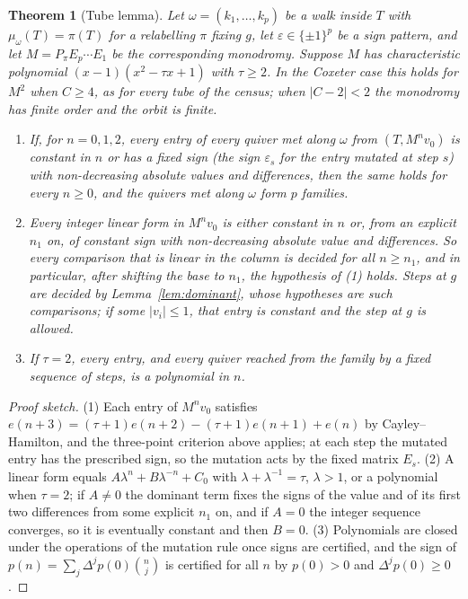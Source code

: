 \documentclass[11pt]{amsart}
\newtheorem{theorem}{Theorem}[section]
\theoremstyle{definition}
\theoremstyle{remark}
\begin{document}
\begin{theorem}[Tube lemma]\label{thm:tube}
Let $\omega=(k_1,\dots,k_p)$ be a walk inside $T$ with $\mu_\omega(T)=\pi(T)$ for a relabelling $\pi$ fixing $g$, let $\varepsilon\in\{\pm1\}^p$ be a sign pattern, and let $M=P_\pi E_p\cdots E_1$ be the corresponding monodromy. Suppose $M$ has characteristic polynomial $(x-1)(x^2-\tau x+1)$ with $\tau\ge2$. In the Coxeter case this holds for $M^2$ when $C\ge4$, as for every tube of the census; when $|C-2|<2$ the monodromy has finite order and the orbit is finite.
\begin{enumerate}
\item If, for $n=0,1,2$, every entry of every quiver met along $\omega$ from $(T,M^nv_0)$ is constant in $n$ or has a fixed sign (the sign $\varepsilon_s$ for the entry mutated at step $s$) with non-decreasing absolute values and differences, then the same holds for every $n\ge0$, and the quivers met along $\omega$ form $p$ families.
\item Every integer linear form in $M^nv_0$ is either constant in $n$ or, from an explicit $n_1$ on, of constant sign with non-decreasing absolute value and differences. So every comparison that is linear in the column is decided for all $n\ge n_1$, and in particular, after shifting the base to $n_1$, the hypothesis of (1) holds. Steps at $g$ are decided by Lemma~\ref{lem:dominant}, whose hypotheses are such comparisons; if some $|v_i|\le1$, that entry is constant and the step at $g$ is allowed.
\item If $\tau=2$, every entry, and every quiver reached from the family by a fixed sequence of steps, is a polynomial in $n$.
\end{enumerate}
\end{theorem}
\begin{proof}[Proof sketch]
(1) Each entry of $M^nv_0$ satisfies $e(n+3)=(\tau+1)e(n+2)-(\tau+1)e(n+1)+e(n)$ by Cayley--Hamilton, and the three-point criterion above applies; at each step the mutated entry has the prescribed sign, so the mutation acts by the fixed matrix $E_s$. (2) A linear form equals $A\lambda^n+B\lambda^{-n}+C_0$ with $\lambda+\lambda^{-1}=\tau$, $\lambda>1$, or a polynomial when $\tau=2$; if $A\ne0$ the dominant term fixes the signs of the value and of its first two differences from some explicit $n_1$ on, and if $A=0$ the integer sequence converges, so it is eventually constant and then $B=0$. (3) Polynomials are closed under the operations of the mutation rule once signs are certified, and the sign of $p(n)=\sum_j\Delta^jp(0)\binom nj$ is certified for all $n$ by $p(0)>0$ and $\Delta^jp(0)\ge0$.
\end{proof}
\end{document}
